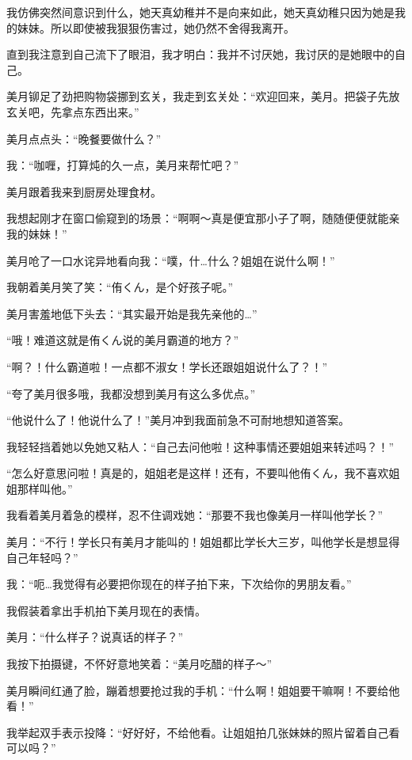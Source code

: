 我仿佛突然间意识到什么，她天真幼稚并不是向来如此，她天真幼稚只因为她是我的妹妹。所以即使被我狠狠伤害过，她仍然不舍得我离开。

直到我注意到自己流下了眼泪，我才明白：我并不讨厌她，我讨厌的是她眼中的自己。

\cutlinesmb

\newday{\love\sunny\sunset}

美月铆足了劲把购物袋挪到玄关，我走到玄关处：“欢迎回来，美月。把袋子先放玄关吧，先拿点东西出来。”

美月点点头：“晚餐要做什么？”

我：“咖喱，打算炖的久一点，美月来帮忙吧？”

美月跟着我来到厨房处理食材。

我想起刚才在窗口偷窥到的场景：“啊啊～真是便宜那小子了啊，随随便便就能亲我的妹妹！”

美月呛了一口水诧异地看向我：“噗，什…什么？姐姐在说什么啊！”

我朝着美月笑了笑：“侑くん，是个好孩子呢。”

美月害羞地低下头去：“其实最开始是我先亲他的…”

“哦！难道这就是侑くん说的美月霸道的地方？”

“啊？！什么霸道啦！一点都不淑女！学长还跟姐姐说什么了？！”

“夸了美月很多哦，我都没想到美月有这么多优点。”

“他说什么了！他说什么了！”美月冲到我面前急不可耐地想知道答案。

我轻轻挡着她以免她又粘人：“自己去问他啦！这种事情还要姐姐来转述吗？！”

“怎么好意思问啦！真是的，姐姐老是这样！还有，不要叫他侑くん，我不喜欢姐姐那样叫他。”

我看着美月着急的模样，忍不住调戏她：“那要不我也像美月一样叫他学长？”

美月：“不行！学长只有美月才能叫的！姐姐都比学长大三岁，叫他学长是想显得自己年轻吗？”

我：“呃…我觉得有必要把你现在的样子拍下来，下次给你的男朋友看。”

我假装着拿出手机拍下美月现在的表情。

美月：“什么样子？说真话的样子？”

我按下拍摄键，不怀好意地笑着：“美月吃醋的样子～”

美月瞬间红通了脸，蹦着想要抢过我的手机：“什么啊！姐姐要干嘛啊！不要给他看！”

我举起双手表示投降：“好好好，不给他看。让姐姐拍几张妹妹的照片留着自己看可以吗？”

